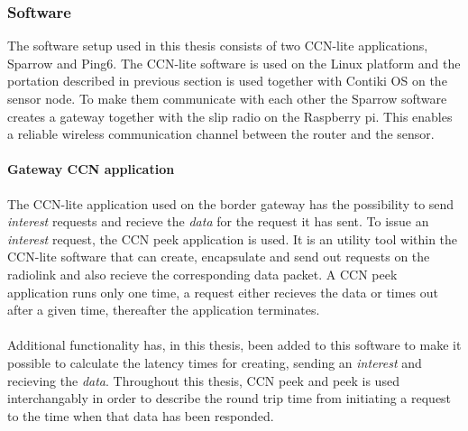 \subsubsection{Software}
The software setup used in this thesis consists of two CCN-lite applications, Sparrow and Ping6. The CCN-lite software is used on the Linux platform and the portation described in previous section is used together with Contiki OS on the sensor node. To make them communicate with each other the Sparrow software creates a gateway together with the slip radio on the Raspberry pi. This enables a reliable wireless communication channel between the router and the sensor.

\paragraph{Gateway CCN application}
The CCN-lite application used on the border gateway has the possibility to send \textit{interest} requests and recieve the \textit{data} for the request it has sent. To issue an \textit{interest} request, the CCN peek application is used. It is an utility tool within the CCN-lite software that can create, encapsulate and send out requests on the radiolink and also recieve the corresponding data packet. A CCN peek application runs only one time, a request either recieves the data or times out after a given time, thereafter the application terminates.\\\\
Additional functionality has, in this thesis, been added to this software to make it possible to calculate the latency times for creating, sending an \textit{interest} and recieving the \textit{data}. Throughout this thesis, CCN peek and peek is used interchangably in order to describe the round trip time from initiating a request to the time when that data has been responded. 

